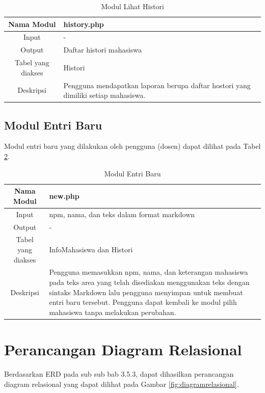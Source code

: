 \begin{table}[ht]
\centering
\caption[Tabel Modul Lihat Histori]{Modul Lihat Histori}
\label{tab:modullihathistori}
\begin{tabular}{|c|p{7cm}|}
\hline
Nama Modul & history.php\\
\hline
Input & -\\
\hline
Output & Daftar histori mahasiswa\\
\hline
Tabel yang diakses & Histori\\
\hline
Deskripsi & Pengguna mendapatkan laporan berupa daftar hostori yang dimiliki
setiap mahasiswa.\\
\hline
\end{tabular}
\end{table}

\subsection{Modul Entri Baru}
Modul entri baru yang dilakukan oleh pengguna (dosen) dapat dilihat pada Tabel
\ref{tab:modulentribaru}.

\begin{table}[ht]
\centering
\caption[Tabel Modul Entri Baru]{Modul Entri Baru} 
\label{tab:modulentribaru}
\begin{tabular}{|c|p{7cm}|}
\hline
Nama Modul & new.php\\
\hline
Input & npm, nama, dan teks dalam format markdown\\
\hline
Output & -\\
\hline
Tabel yang diakses & InfoMahasiswa dan Histori\\
\hline
Deskripsi & Pengguna memasukkan npm, nama, dan keterangan mahasiswa pada teks
area yang telah disediakan menggunakan teks dengan sintaks Markdown lalu
pengguna menyimpan untuk membuat entri baru tersebut. Pengguna dapat kembali ke
modul pilih mahasiswa tanpa melakukan perubahan.\\
\hline
\end{tabular}
\end{table}

\section{Perancangan Diagram Relasional}
\label{sec:perancangandiagramrelasional}

Berdasarkan ERD pada sub sub bab 3.5.3, dapat dihasilkan perancangan diagram relasional yang dapat dilihat pada Gambar \ref{fig:diagramrelasional}.

